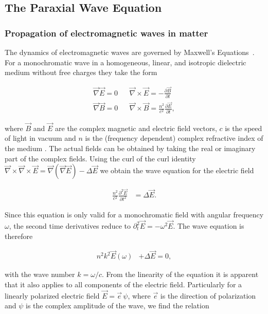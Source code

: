 

\subsection{The Paraxial Wave Equation}

\subsubsection{Propagation of electromagnetic waves in matter}

The dynamics of electromagnetic waves are governed by Maxwell's Equations~\cite{PriciplesOfOptics}. For a monochromatic wave in a homogeneous, linear, and isotropic dielectric medium without free charges they take the form

\begin{eqnarray*}
\vec \nabla \vec E = 0 && \vec \nabla \times \vec E = - \frac{ \partial \vec B }{ \partial t }  \\
\vec \nabla \vec B = 0 && \vec \nabla \times \vec B = \frac{n^2}{c^2} \frac{ \partial \vec E }{ \partial t },
\end{eqnarray*}

where $\vec B$ and $\vec E$ are the complex magnetic and electric field vectors, $c$ is the speed of light in vacuum and $n$ is the (frequency dependent) complex refractive index of the medium \cite{attwood2007soft}. The actual fields can be obtained by taking the real or imaginary part of the complex fields. Using the curl of the curl identity $\vec \nabla \times \vec \nabla \times \vec E = \vec \nabla (\vec \nabla  \vec E ) - \Delta  \vec E$ we obtain the wave equation for the electric field

\begin{align} \label{eq:wave_equation} 
\frac{n^2}{c^2} \frac{ \partial^2 \vec E }{ \partial t^2 } & = \Delta \vec E.
\end{align}

Since this equation is only valid for a monochromatic field with angular frequency $\omega$, the second time derivatives reduce to $\partial_t^2 \vec E = -  \omega^2 \vec E$. The wave equation is therefore

\begin{align*}
    n^2 k^2 \vec{ E }(\omega) & + \Delta  \vec{ E } = 0 ,
\end{align*}

with the wave number $k = \omega/c$. From the linearity of the equation it is apparent that it also applies to all components of the electric field. Particularly for a linearly polarized electric field $\vec{E} = \vec{e} \, \psi $, where $\vec{e}$ is the direction of polarization and $\psi$ is the complex amplitude of the wave, we find the relation

